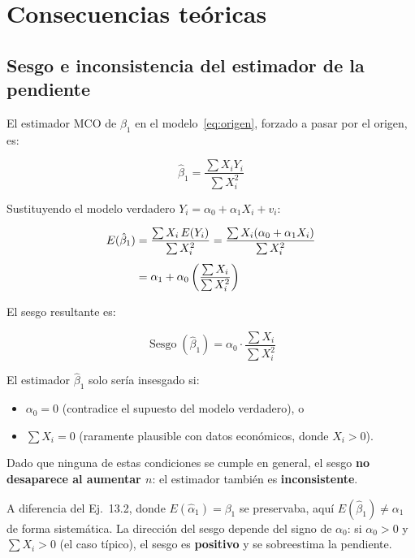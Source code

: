 \documentclass[12pt, letterpaper]{article}
\begin{document}
\section{Consecuencias teóricas}

\subsection{Sesgo e inconsistencia del estimador de la pendiente}

El estimador MCO de $\beta_1$ en el modelo~\eqref{eq:origen}, forzado a
pasar por el origen, es:

\begin{equation}
  \hat{\beta}_1 = \frac{\sum X_i Y_i}{\sum X_i^2}
\end{equation}

Sustituyendo el modelo verdadero $Y_i = \alpha_0 + \alpha_1 X_i + v_i$:

\begin{align}
  E(\hat{\beta}_1)
  &= \frac{\sum X_i\,E(Y_i)}{\sum X_i^2}
   = \frac{\sum X_i(\alpha_0 + \alpha_1 X_i)}{\sum X_i^2} \notag \\[4pt]
  &= \alpha_1 + \alpha_0\left(\frac{\sum X_i}{\sum X_i^2}\right)
\end{align}

El sesgo resultante es:

\begin{equation}
  \boxed{
    \operatorname{Sesgo}(\hat{\beta}_1)
    = \alpha_0 \cdot \frac{\sum X_i}{\sum X_i^2}
  }
\end{equation}

El estimador $\hat{\beta}_1$ solo sería insesgado si:

\begin{itemize}[leftmargin=1.8em]
  \item $\alpha_0 = 0$ \quad (contradice el supuesto del modelo verdadero), o
  \item $\sum X_i = 0$ \quad (raramente plausible con datos económicos, donde $X_i > 0$).
\end{itemize}

Dado que ninguna de estas condiciones se cumple en general, el sesgo
\textbf{no desaparece al aumentar $n$}: el estimador también es
\textbf{inconsistente}.

\begin{clave}
  A diferencia del Ej.~13.2, donde $E(\hat{\alpha}_1) = \beta_1$ se
  preservaba, aquí $E(\hat{\beta}_1) \neq \alpha_1$ de forma sistemática.
  La dirección del sesgo depende del signo de $\alpha_0$: si $\alpha_0 > 0$
  y $\sum X_i > 0$ (el caso típico), el sesgo es \textbf{positivo} y se
  sobreestima la pendiente.
\end{clave}
\end{document}
